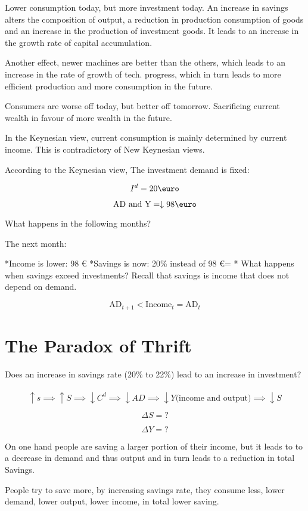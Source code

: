 \documentclass{report}
\begin{document}
Lower consumption today, but more investment today. An increase in savings alters the composition of output, a reduction in production consumption of goods and an increase in the production of investment goods. It leads to an increase in the growth rate of capital accumulation. 

Another effect, newer machines are better than the others, which leads to an increase in the rate of growth of tech. progress, which in turn leads to more efficient production and more consumption in the future. 

Consumers are worse off today, but better off tomorrow. Sacrificing current wealth in favour of more wealth in the future. 

In the Keynesian view, current consumption is mainly determined by current income. This is contradictory of New Keynesian views.


According to the Keynesian view,
The investment demand is fixed:

$$I^d = 20 \text{\euro}$$

$$\text{AD and Y} = \downarrow 98 \text{\euro}$$

What happens in the following months? 

The next month:

*Income is lower: 98 \euro
*Savings is now: 20\% instead of 98 \euro =
* What happens when savings exceed investments? Recall that savings is income that does not depend on demand. 

$$\text{AD}_{t + 1} < \text{Income}_t = \text{AD}_t$$

\section{The Paradox of Thrift}

Does an increase in savings rate (20\% to 22\%)  lead to an increase in investment? \
\
$$\uparrow s \implies \uparrow S \implies \downarrow C^d \implies \downarrow AD \implies \downarrow Y \text{(income and output)} \implies \downarrow S$$

$$\Delta S = ?$$

$$\Delta Y = ?$$

On one hand people are saving a larger portion of their income, but it leads to to a decrease in demand and thus output and in turn leads to a reduction in total Savings. 

People try to save more, by increasing savings rate, they consume less, lower demand, lower output, lower income, in total lower saving. 
\end{document}
